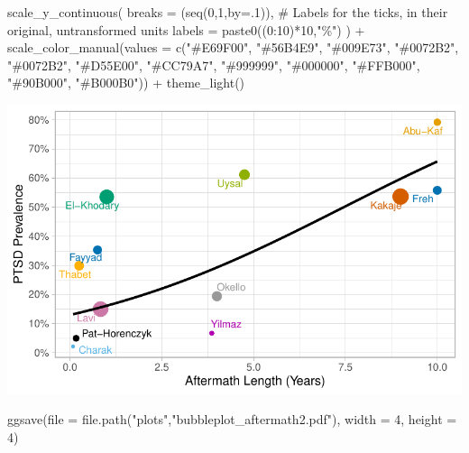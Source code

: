 \documentclass[
  letterpaper,
  DIV=11,
  numbers=noendperiod]{scrartcl}
\newenvironment{Shaded}{\begin{snugshade}}{\end{snugshade}}
\newcommand{\AttributeTok}[1]{\textcolor[rgb]{0.40,0.45,0.13}{#1}}
\newcommand{\CommentTok}[1]{\textcolor[rgb]{0.37,0.37,0.37}{#1}}
\newcommand{\DecValTok}[1]{\textcolor[rgb]{0.68,0.00,0.00}{#1}}
\newcommand{\FunctionTok}[1]{\textcolor[rgb]{0.28,0.35,0.67}{#1}}
\newcommand{\NormalTok}[1]{\textcolor[rgb]{0.00,0.23,0.31}{#1}}
\newcommand{\SpecialCharTok}[1]{\textcolor[rgb]{0.37,0.37,0.37}{#1}}
\newcommand{\StringTok}[1]{\textcolor[rgb]{0.13,0.47,0.30}{#1}}
\begin{document}
\begin{Shaded}
\begin{Highlighting}[]
  \FunctionTok{scale\_y\_continuous}\NormalTok{(}
    \AttributeTok{breaks =}\NormalTok{ (}\FunctionTok{seq}\NormalTok{(}\DecValTok{0}\NormalTok{,}\DecValTok{1}\NormalTok{,}\AttributeTok{by=}\NormalTok{.}\DecValTok{1}\NormalTok{)), }\CommentTok{\# Labels for the ticks, in their original, untransformed units}
    \AttributeTok{labels =} \FunctionTok{paste0}\NormalTok{((}\DecValTok{0}\SpecialCharTok{:}\DecValTok{10}\NormalTok{)}\SpecialCharTok{*}\DecValTok{10}\NormalTok{,}\StringTok{"\%"}\NormalTok{)}
\NormalTok{  ) }\SpecialCharTok{+}
  \FunctionTok{scale\_color\_manual}\NormalTok{(}\AttributeTok{values =} \FunctionTok{c}\NormalTok{(}\StringTok{"\#E69F00"}\NormalTok{, }\StringTok{"\#56B4E9"}\NormalTok{, }\StringTok{"\#009E73"}\NormalTok{, }\StringTok{"\#0072B2"}\NormalTok{, }\StringTok{"\#0072B2"}\NormalTok{, }\StringTok{"\#D55E00"}\NormalTok{, }\StringTok{"\#CC79A7"}\NormalTok{, }\StringTok{"\#999999"}\NormalTok{, }\StringTok{"\#000000"}\NormalTok{, }\StringTok{"\#FFB000"}\NormalTok{, }\StringTok{"\#90B000"}\NormalTok{, }\StringTok{"\#B000B0"}\NormalTok{)) }\SpecialCharTok{+} 
  \FunctionTok{theme\_light}\NormalTok{()}
\end{Highlighting}
\end{Shaded}

\includegraphics{1_descriptive_stats_files/figure-pdf/unnamed-chunk-20-1.pdf}

\begin{Shaded}
\begin{Highlighting}[]
\FunctionTok{ggsave}\NormalTok{(}\AttributeTok{file =} \FunctionTok{file.path}\NormalTok{(}\StringTok{"plots"}\NormalTok{,}\StringTok{"bubbleplot\_aftermath2.pdf"}\NormalTok{), }\AttributeTok{width =} \DecValTok{4}\NormalTok{, }\AttributeTok{height =} \DecValTok{4}\NormalTok{)}
\end{Highlighting}
\end{Shaded}
\end{document}
